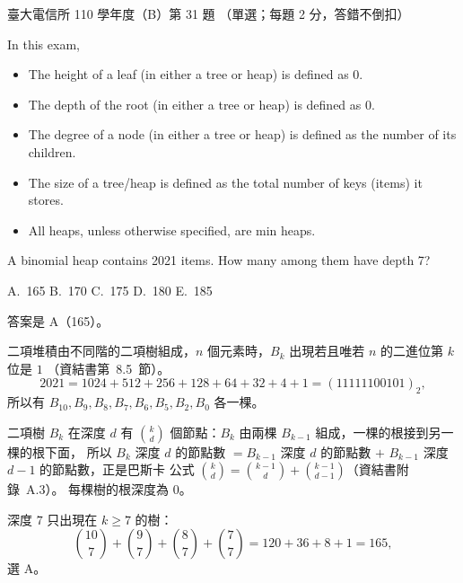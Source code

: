 \begin{pastexam}[label={px:ntu-110-comm-dsa-31}]{臺大電信所 110 學年度（B）第 31 題}
（單選；每題 2 分，答錯不倒扣）

In this exam,
\begin{itemize}
\item The height of a leaf (in either a tree or heap) is defined as 0.
\item The depth of the root (in either a tree or heap) is defined as 0.
\item The degree of a node (in either a tree or heap) is defined as the number of its children.
\item The size of a tree/heap is defined as the total number of keys (items) it stores.
\item All heaps, unless otherwise specified, are min heaps.
\end{itemize}

A binomial heap contains 2021 items. How many among them have depth 7?

A.~165 \qquad B.~170 \qquad C.~175 \qquad D.~180 \qquad E.~185
\end{pastexam}

\begin{pastsoln}
答案是 A（165）。

二項堆積由不同階的二項樹組成，$n$ 個元素時，$B_k$ 出現若且唯若 $n$ 的二進位第 $k$ 位是 $1$
（資結書第~8.5~節）。
\[
2021 = 1024 + 512 + 256 + 128 + 64 + 32 + 4 + 1 = (11111100101)_2,
\]
所以有 $B_{10}, B_9, B_8, B_7, B_6, B_5, B_2, B_0$ 各一棵。

二項樹 $B_k$ 在深度 $d$ 有 $\binom{k}{d}$ 個節點：$B_k$ 由兩棵 $B_{k-1}$ 組成，一棵的根接到另一棵的根下面，
所以 $B_k$ 深度 $d$ 的節點數 $= B_{k-1}$ 深度 $d$ 的節點數 $+$ $B_{k-1}$ 深度 $d - 1$ 的節點數，正是巴斯卡
公式 $\binom{k}{d} = \binom{k-1}{d} + \binom{k-1}{d-1}$（資結書附錄~A.3）。 每棵樹的根深度為 $0$。

深度 $7$ 只出現在 $k \ge 7$ 的樹：
\[
\binom{10}{7} + \binom{9}{7} + \binom{8}{7} + \binom{7}{7} = 120 + 36 + 8 + 1 = 165,
\]
選 A。
\end{pastsoln}
